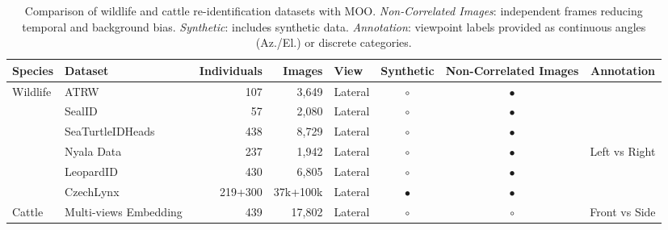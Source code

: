 \begin{table}[tbp]
    \centering
    \caption{
        Comparison of wildlife and cattle re-identification datasets with MOO.
        \textit{Non-Correlated Images}: independent frames reducing temporal and background bias.
        \textit{Synthetic}: includes synthetic data.
        \textit{Annotation}: viewpoint labels provided as continuous angles (Az./El.) or discrete categories.
    }
    \label{tab:dataset metrics}

    \scriptsize

    \begin{tabular}{llrrlccc}
        \toprule

        \textbf{Species}
        & \textbf{Dataset}
        & \textbf{Individuals}
        & \textbf{Images}
        & \textbf{View}
        & \textbf{Synthetic}
        & \textbf{Non-Correlated Images}
        & \textbf{Annotation} \\

        \midrule
        \multirow{6}{*}{Wildlife}

        & ATRW~\cite{liATRWBenchmarkAmur2020}
        & 107 & 3,649 & Lateral & $\circ$ & $\bullet$ & \\

        & SealID~\cite{nepovinnykhSealIDSaimaaRinged2022a}
        & 57 & 2,080 & Lateral & $\circ$ & $\bullet$ & \\

        & SeaTurtleIDHeads~\cite{adamSeaTurtleID2022LongspanDataset2024a}
        & 438 & 8,729 & Lateral & $\circ$ & $\bullet$ & \\

        & Nyala Data~\cite{dlaminiAutomatedIdentificationIndividuals2020b}
        & 237 & 1,942 & Lateral & $\circ$ & $\bullet$ & Left vs Right \\

        & LeopardID~\cite{atanbori2024spots}
        & 430 & 6,805 & Lateral & $\circ$ & $\bullet$ & \\

        & CzechLynx~\cite{picekCzechLynxDatasetIndividual2025}
        & 219+300 & 37k+100k & Lateral & $\bullet$ & $\bullet$ & \\

        \midrule
        \multirow{10}{*}{Cattle}

        & Multi-views Embedding~\cite{bergaminiMultiviewsEmbeddingCattle2018a}
        & 439 & 17,802 & Lateral & $\circ$ & $\circ$ & Front vs Side \\


\end{tabular}
\end{table}
